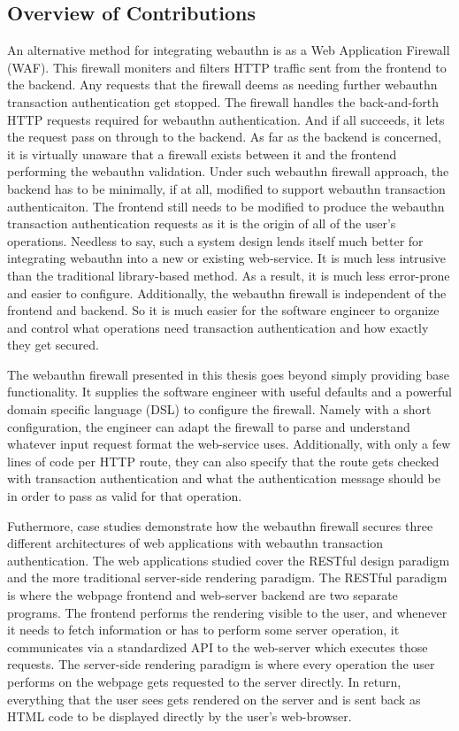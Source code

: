 \subsection{Overview of Contributions}

An alternative method for integrating webauthn is as a Web Application Firewall (WAF). This firewall moniters and filters HTTP traffic sent from the frontend to the backend. Any requests that the firewall deems as needing further webauthn transaction authentication get stopped. The firewall handles the back-and-forth HTTP requests required for webauthn authentication. And if all succeeds, it lets the request pass on through to the backend. As far as the backend is concerned, it is virtually unaware that a firewall exists between it and the frontend performing the webauthn validation. Under such webauthn firewall approach, the backend has to be minimally, if at all, modified to support webauthn transaction authenticaiton. The frontend still needs to be modified to produce the webauthn transaction authentication requests as it is the origin of all of the user's operations. Needless to say, such a system design lends itself much better for integrating webauthn into a new or existing web-service. It is much less intrusive than the traditional library-based method. As a result, it is much less error-prone and easier to configure. Additionally, the webauthn firewall is independent of the frontend and backend. So it is much easier for the software engineer to organize and control what operations need transaction authentication and how exactly they get secured. 

The webauthn firewall presented in this thesis goes beyond simply providing base functionality. It supplies the software engineer with useful defaults and a powerful domain specific language (DSL) to configure the firewall. Namely with a short configuration, the engineer can adapt the firewall to parse and understand whatever input request format the web-service uses. Additionally, with only a few lines of code per HTTP route, they can also specify that the route gets checked with transaction authentication and what the authentication message should be in order to pass as valid for that operation. 

Futhermore, case studies demonstrate how the webauthn firewall secures three different architectures of web applications with webauthn transaction authentication. The web applications studied cover the RESTful design paradigm and the more traditional server-side rendering paradigm. The RESTful paradigm is where the webpage frontend and web-server backend are two separate programs. The frontend performs the rendering visible to the user, and whenever it needs to fetch information or has to perform some server operation, it communicates via a standardized API to the web-server which executes those requests. The server-side rendering paradigm is where every operation the user performs on the webpage gets requested to the server directly. In return, everything that the user sees gets rendered on the server and is sent back as HTML code to be displayed directly by the user's web-browser.

